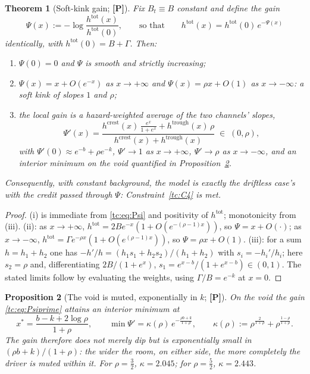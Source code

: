 \documentclass[11pt]{article}
\numberwithin{equation}{section}
\theoremstyle{plain}
\newtheorem{theorem}{Theorem}[section]
\newtheorem{proposition}[theorem]{Proposition}
\theoremstyle{definition}
\theoremstyle{remark}
\begin{document}
\begin{theorem}[Soft-kink gain; \textbf{[P]}]\label{tc:thm:gain}
Fix $B_t\equiv B$ constant and define the \emph{gain}
\begin{equation}\label{tc:eq:Psi}
\Psi(x):=-\log\frac{h^{\mathrm{tot}}(x)}{h^{\mathrm{tot}}(0)},
\qquad\text{so that}\qquad
h^{\mathrm{tot}}(x)=h^{\mathrm{tot}}(0)\,e^{-\Psi(x)}
\end{equation}
identically, with $h^{\mathrm{tot}}(0)=B+\Gamma$. Then:
\begin{enumerate}[label=\emph{(\roman*)},itemsep=1pt]
\item $\Psi(0)=0$ and $\Psi$ is smooth and strictly increasing;
\item $\Psi(x)=x+O(e^{-x})$ as $x\to+\infty$ and
$\Psi(x)=\rho x+O(1)$ as $x\to-\infty$: a \emph{soft kink} of slopes
$1$ and $\rho$;
\item the local gain is a hazard-weighted average of the two channels'
slopes,
\begin{equation}\label{tc:eq:Psiprime}
\Psi'(x)=\frac{h^{\mathrm{crest}}(x)\,\frac{e^{x}}{1+e^{x}}
+h^{\mathrm{trough}}(x)\,\rho}
{h^{\mathrm{crest}}(x)+h^{\mathrm{trough}}(x)}\;\in\;(0,\rho),
\end{equation}
with $\Psi'(0)\approx e^{-b}+\rho e^{-k}$, $\Psi'\to1$ as
$x\to+\infty$, $\Psi'\to\rho$ as $x\to-\infty$, and an interior minimum
on the void quantified in Proposition~\ref{tc:prop:mingain}.
\end{enumerate}
Consequently, with constant background, the model is exactly the driftless case's with the credit passed through $\Psi$: Constraint~\ref{tc:C4} is
met.
\end{theorem}

\begin{proof}
(i) is immediate from \eqref{tc:eq:Psi} and positivity of
$h^{\mathrm{tot}}$; monotonicity from (iii). (ii): as $x\to+\infty$,
$h^{\mathrm{tot}}=2Be^{-x}(1+O(e^{-(\rho-1)x}))$, so $\Psi=x+O(\cdot)$;
as $x\to-\infty$, $h^{\mathrm{tot}}=\Gamma e^{-\rho x}(1+O(e^{(\rho-1)
x}))$, so $\Psi=\rho x+O(1)$. (iii): for a sum $h=h_1+h_2$ one has
$-h'/h=(h_1s_1+h_2s_2)/(h_1+h_2)$ with $s_i=-h_i'/h_i$; here
$s_2=\rho$ and, differentiating $2B/(1+e^{x})$,
$s_1=e^{x-b}/(1+e^{x-b})\in(0,1)$. The stated limits follow by
evaluating the weights, using $\Gamma/B=e^{-k}$ at $x=0$.
\end{proof}

\begin{proposition}[The void is muted, exponentially in $k$;
\textbf{[P]}]\label{tc:prop:mingain}
On the void the gain \eqref{tc:eq:Psiprime} attains an interior minimum
at
\begin{equation}\label{tc:eq:xstar}
x^{*}=\frac{b-k+2\log\rho}{1+\rho},
\qquad
\min\Psi'=\kappa(\rho)\,e^{-\frac{\rho b+k}{1+\rho}},
\qquad
\kappa(\rho):=\rho^{\frac{2}{1+\rho}}+\rho^{\frac{1-\rho}{1+\rho}} .
\end{equation}
The gain therefore does not merely dip but is \emph{exponentially small
in $(\rho b+k)/(1+\rho)$}: the wider the room, on either side, the
more completely the driver is muted within it. For $\rho=\tfrac32$,
$\kappa=2.045$; for $\rho=\tfrac52$, $\kappa=2.443$.
\end{proposition}
\end{document}
